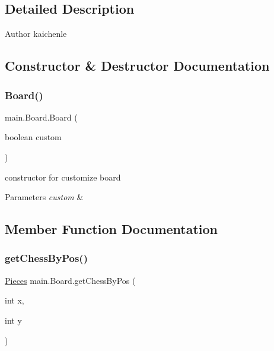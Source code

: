 \subsection{Detailed Description}
\begin{DoxyAuthor}{Author}
kaichenle 
\end{DoxyAuthor}


\subsection{Constructor \& Destructor Documentation}
\mbox{\label{classmain_1_1_board_a76177c2c47c5a55f8027c511d0e1e6d2}} 
\subsubsection{\texorpdfstring{Board()}{Board()}}
{\footnotesize\ttfamily main.\+Board.\+Board (\begin{DoxyParamCaption}\item[{boolean}]{custom }\end{DoxyParamCaption})\hspace{0.3cm}{\ttfamily [inline]}}

constructor for customize board 
\begin{DoxyParams}{Parameters}
{\em custom} & \\
\hline
\end{DoxyParams}


\subsection{Member Function Documentation}
\mbox{\label{classmain_1_1_board_a5c13bad815e095818515980a72f947a2}} 
\subsubsection{\texorpdfstring{get\+Chess\+By\+Pos()}{getChessByPos()}}
{\footnotesize\ttfamily \mbox{\hyperlink{classmain_1_1_pieces}{Pieces}} main.\+Board.\+get\+Chess\+By\+Pos (\begin{DoxyParamCaption}\item[{int}]{x,  }\item[{int}]{y }\end{DoxyParamCaption})\hspace{0.3cm}{\ttfamily [inline]}}

